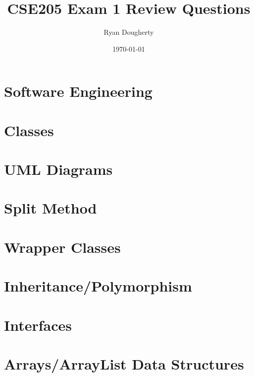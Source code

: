 \documentclass{article}
\title{CSE205 Exam 1 Review Questions}
\author{Ryan Dougherty}
\date{\today}
\begin{document}
\maketitle

\section{Software Engineering}

\section{Classes}

\section{UML Diagrams}

\section{Split Method}

\section{Wrapper Classes}

\section{Inheritance/Polymorphism}

\section{Interfaces}

\section{Arrays/ArrayList Data Structures}
\end{document}
